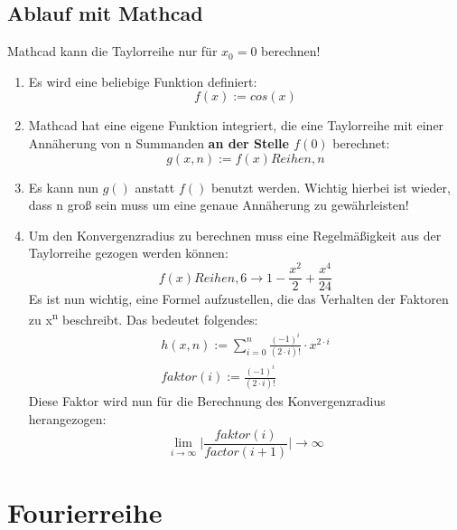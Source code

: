 \documentclass[a4paper,10pt]{article}
\begin{document}
\subsection{Ablauf mit Mathcad}
Mathcad kann die Taylorreihe nur für $ x_0 = 0 $ berechnen!
\begin{enumerate}
\item { Es wird eine beliebige Funktion definiert:
    \begin{equation}
      \label{eq:1}
      f(x) := cos(x)
    \end{equation}
  }
\item { Mathcad hat eine eigene Funktion integriert, die eine
    Taylorreihe mit einer Annäherung von n Summanden \textbf{an der
      Stelle $ f(0) $} berechnet:
    \begin{equation}
      \label{eq:2}
      g(x, n) := f(x) Reihen, n
    \end{equation}
  }
\item { Es kann nun $ g() $ anstatt $ f() $ benutzt werden. Wichtig
    hierbei ist wieder, dass n groß sein muss um eine genaue
    Annäherung zu gewährleisten!
  }
\item { Um den Konvergenzradius zu berechnen muss eine Regelmäßigkeit
    aus der Taylorreihe gezogen werden können:
    \begin{equation}
      \label{eq:14}
      f(x) Reihen, 6 \rightarrow 1 - \frac{x^2}{2} + \frac{x^4}{24}
    \end{equation}
    Es ist nun wichtig, eine Formel aufzustellen, die das Verhalten
    der Faktoren zu x\textsuperscript{n} beschreibt. Das bedeutet
    folgendes:
    \begin{equation}
      \label{eq:15}
      \begin{split}
        h(x, n) := \sum_{i = 0}^{n} \frac{(-1)^i}{(2 \cdot i)!} \cdot x^{2 \cdot i}\\
        faktor(i) := \frac{(-1)^i}{(2 \cdot i)!}
      \end{split}
    \end{equation}
    Diese Faktor wird nun für die Berechnung des Konvergenzradius
    herangezogen:
    \begin{equation}
      \label{eq:16}
      \lim_{i\to\infty} \lvert \frac{faktor(i)}{factor(i + 1)} \rvert \rightarrow \infty
    \end{equation}
  }
\end{enumerate}

\section{Fourierreihe}
\end{document}
